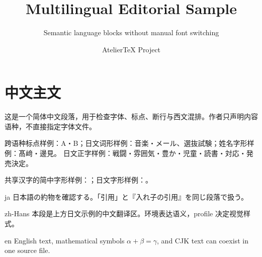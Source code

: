 \documentclass[profile=editorial]{atelier}
\title{Multilingual Editorial Sample}
\subtitle{Semantic language blocks without manual font switching}
\author{AtelierTeX Project}
\begin{document}
\maketitle

\section{中文主文}
这是一个简体中文段落，用于检查字体、标点、断行与西文混排。作者只声明内容语种，不直接指定字体文件。

跨语种标点样例：A・B；日文词形样例：音楽・メール、選抜試験；姓名字形样例：髙﨑・邊見。
日文正字样例：戦闘・雰囲気・豊か・児童・読書・対応・発売決定。

共享汉字的简中字形样例：；日文字形样例：。

\begin{AtelierLanguage}{ja}
日本語の約物を確認する。「引用」と『入れ子の引用』を同じ段落で扱う。
\end{AtelierLanguage}

\begin{AtelierTranslation}{zh-Hans}
本段是上方日文示例的中文翻译区。环境表达语义，profile 决定视觉样式。
\end{AtelierTranslation}

\begin{AtelierLanguage}{en}
English text, mathematical symbols $\alpha + \beta = \gamma$, and CJK text can coexist in one source file.
\end{AtelierLanguage}
\end{document}
